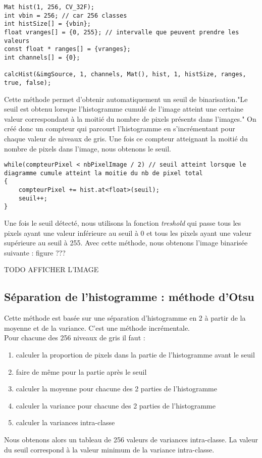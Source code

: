 \documentclass{article}
\begin{document}
 \begin{lstlisting}
Mat hist(1, 256, CV_32F);
int vbin = 256; // car 256 classes
int histSize[] = {vbin};
float vranges[] = {0, 255}; // intervalle que peuvent prendre les valeurs
const float * ranges[] = {vranges};
int channels[] = {0};

calcHist(&imgSource, 1, channels, Mat(), hist, 1, histSize, ranges, true, false);
\end{lstlisting}

 Cette méthode permet d'obtenir automatiquement un seuil de binarisation."Le seuil est obtenu lorsque l'histogramme cumulé de l'image atteint une certaine valeur correspondant à la moitié du nombre de pixels présents dans l'images." On créé donc un compteur qui parcourt l'histogramme en s'incrémentant pour chaque valeur de niveaux de gris. Une fois ce compteur atteignant la moitié du nombre de pixels dans l'image, nous obtenons le seuil.\\

 \begin{lstlisting}
while(compteurPixel < nbPixelImage / 2) // seuil atteint lorsque le diagramme cumule atteint la moitie du nb de pixel total
{
    compteurPixel += hist.at<float>(seuil);
    seuil++;
}
 \end{lstlisting}

Une fois le seuil détecté, nous utilisons la fonction \emph{treshold} qui passe tous les pixels ayant une valeur inférieure au seuil à 0 et tous les pixels ayant une valeur supérieure au seuil à 255.
 Avec cette méthode, nous obtenons l'image binarisée suivante : figure ???

 TODO AFFICHER L'IMAGE


 \subsection{Séparation de l'histogramme : méthode d'Otsu}
 Cette méthode est basée sur une séparation d'histogramme en 2 à partir de la moyenne et de la variance. C'est une méthode incrémentale.\\

 Pour chacune des 256 niveaux de gris il faut :
 \begin{enumerate}
 	\item calculer la proportion de pixels dans la partie de l'histogramme avant le seuil
 	\item faire de même pour la partie après le seuil
 	\item calculer la moyenne pour chacune des 2 parties de l'histogramme
 	\item calculer la variance pour chacune des 2 parties de l'histogramme
 	\item calculer la variances intra-classe
 \end{enumerate}
 Nous obtenons alors un tableau de 256 valeurs de variances intra-classe. La valeur du seuil correspond à la valeur minimum de la variance intra-classe.\\
\end{document}
